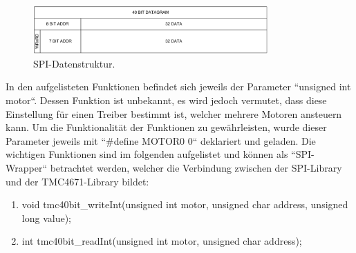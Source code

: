 \begin{figure}[h!]
	\centering
	\includegraphics[width=0.8\textwidth]{graphics/SPI_Datagramm.png}
	\caption{SPI-Datenstruktur.
	\cite{trinamic_datasheet_2018}}
	\label{fig:SPI_Datenstruktur}
\end{figure}

In den aufgelisteten Funktionen befindet sich jeweils der Parameter ``unsigned int motor``. Dessen Funktion ist unbekannt, es wird jedoch vermutet, dass diese Einstellung für einen Treiber bestimmt ist, welcher mehrere Motoren ansteuern kann. Um die Funktionalität der Funktionen zu gewährleisten, wurde dieser Parameter jeweils mit ``\#define MOTOR0 0`` deklariert und geladen. Die wichtigen Funktionen sind im folgenden aufgelistet und können als ``SPI-Wrapper`` betrachtet werden, welcher die Verbindung zwischen der SPI-Library und der TMC4671-Library bildet: \cite{noauthor_tmc-evalsystem/tmc4671_eval.c_nodate}

\begin{enumerate}
\item void tmc40bit\_writeInt(unsigned int motor, unsigned char address, unsigned long value);
\item int tmc40bit\_readInt(unsigned int motor, unsigned char address);
\end{enumerate}



